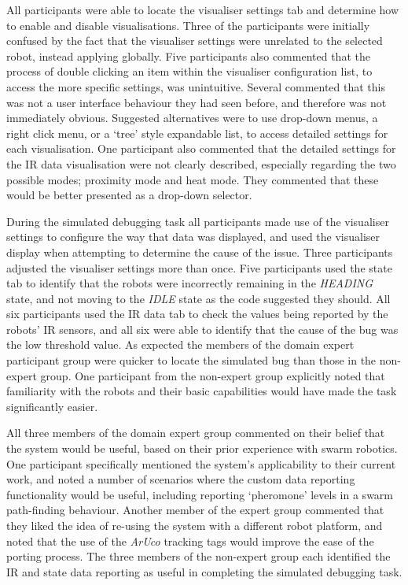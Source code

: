 All participants were able to locate the visualiser settings tab and determine how to enable and disable visualisations. Three of the participants were initially confused by the fact that the visualiser settings were unrelated to the selected robot, instead applying globally. Five participants also commented that the process of double clicking an item within the visualiser configuration list, to access the more specific settings, was unintuitive. Several commented that this was not a user interface behaviour they had seen before, and therefore was not immediately obvious. Suggested alternatives were to use drop-down menus, a right click menu, or a `tree' style expandable list, to access detailed settings for each visualisation. One participant also commented that the detailed settings for the IR data visualisation were not clearly described, especially regarding the two possible modes; proximity mode and heat mode. They commented that these would be better presented as a drop-down selector.

During the simulated debugging task all participants made use of the visualiser settings to configure the way that data was displayed, and used the visualiser display when attempting to determine the cause of the issue. Three participants adjusted the visualiser settings more than once. Five participants used the state tab to identify that the robots were incorrectly remaining in the \textit{HEADING} state, and not moving to the \textit{IDLE} state as the code suggested they should. All six participants used the IR data tab to check the values being reported by the robots' IR sensors, and all six were able to identify that the cause of the bug was the low threshold value. As expected the members of the domain expert participant group were quicker to locate the simulated bug than those in the non-expert group. One participant from the non-expert group explicitly noted that familiarity with the robots and their basic capabilities would have made the task significantly easier.

All three members of the domain expert group commented on their belief that the system would be useful, based on their prior experience with swarm robotics. One participant specifically mentioned the system's applicability to their current work, and noted a number of scenarios where the custom data reporting functionality would be useful, including reporting `pheromone' levels in a swarm path-finding behaviour. Another member of the expert group commented that they liked the idea of re-using the system with a different robot platform, and noted that the use of the \textit{ArUco} tracking tags would improve the ease of the porting process. The three members of the non-expert group each identified the IR and state data reporting as useful in completing the simulated debugging task.


